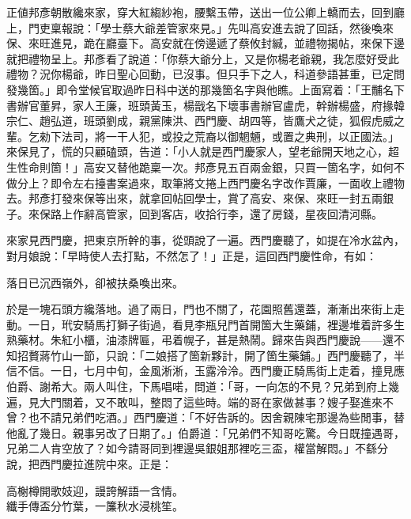 正値邦彥朝散纔來家，穿大紅縐紗袍，腰繫玉帶，送出一位公卿上轎而去，回到廳上，門吏稟報說：「學士蔡大爺差管家來見。」先叫高安進去說了回話，然後喚來保、來旺進見，跪在廳臺下。高安就在傍邊遞了蔡攸封緘，並禮物揭帖，來保下邊就把禮物呈上。邦彥看了說道：「你蔡大爺分上，又是你楊老爺親，我怎麼好受此禮物？況你楊爺，昨日聖心回動，已沒事。但只手下之人，科道參語甚重，已定問發幾箇。」即令堂候官取過昨日科中送的那幾箇名字與他瞧。上面寫着：「王黼名下書辦官董昇，家人王廉，班頭黃玉，楊戩名下壞事書辦官盧虎，幹辦楊盛，府掾韓宗仁、趙弘道，班頭劉成，親黨陳洪、西門慶、胡四等，皆鷹犬之徒，狐假虎威之輩。乞勑下法司，將一干人犯，或投之荒裔以御魍魎，或置之典刑，以正國法。」來保見了，慌的只顧磕頭，告道：「小人就是西門慶家人，望老爺開天地之心，超生性命則箇！」高安又替他跪稟一次。邦彥見五百兩金銀，只買一箇名字，如何不做分上？即令左右擡書案過來，取筆將文捲上西門慶名字改作賈廉，{}一面收上禮物去。邦彥打發來保等出來，就拿回帖回學士，賞了高安、來保、來旺一封五兩銀子。來保路上作辭高管家，回到客店，收拾行李，還了房錢，星夜回清河縣。

來家見西門慶，把東京所幹的事，從頭說了一遍。西門慶聽了，如提在冷水盆內，對月娘說：「早時使人去打點，不然怎了！」正是，這回西門慶性命，有如：

\begin{myquote}
落日已沉西嶺外，卻被扶桑喚出來。
\end{myquote}

於是一塊石頭方纔落地。過了兩日，門也不關了，花園照舊還蓋，漸漸出來街上走動。{}一日，玳安騎馬打獅子街過，看見李瓶兒門首開箇大生藥鋪，裡邊堆着許多生熟藥材。朱紅小櫃，油漆牌匾，弔着幌子，甚是熱鬧。歸來告與西門慶說——還不知招贅蔣竹山一節，只說：「二娘搭了箇新夥計，開了箇生藥鋪。」{}西門慶聽了，半信不信。一日，七月中旬，金風淅淅，玉露泠泠。西門慶正騎馬街上走着，撞見應伯爵、謝希大。兩人叫住，下馬唱喏，問道：「哥，一向怎的不見？兄弟到府上幾遍，見大門關着，又不敢叫，整悶了這些時。端的哥在家做甚事？嫂子娶進來不曾？也不請兄弟們吃酒。」西門慶道：「不好告訴的。因舍親陳宅那邊為些閒事，替他亂了幾日。親事另改了日期了。」伯爵道：「兄弟們不知哥吃驚。今日既撞遇哥，兄弟二人肯空放了？如今請哥同到裡邊吳銀姐那裡吃三盃，權當解悶。」不繇分說，把西門慶拉進院中來。正是：

\begin{myquote}
高榭樽開歌妓迎，謾誇解語一含情。\\纖手傳盃分竹葉，一簾秋水浸桃笙。
\end{myquote}

